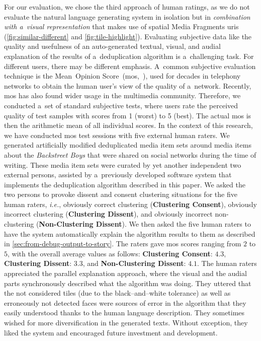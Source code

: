 \documentclass{article}
\begin{document}
For our evaluation, we chose the third approach of human ratings, as we do not evaluate the natural language generating system in isolation but in \emph{combination with a~visual representation} that makes use of spatial Media Fragments {\sc uri}s (\autoref{fig:similar-different} and \autoref{fig:tile-highlight}). Evaluating subjective data like the quality and usefulness of an auto-generated textual, visual, and audial explanation of the results of a~deduplication algorithm is a~challenging task. For different users, there may be different emphasis. A~common subjective evaluation technique
is the Mean~Opinion Score~({\sc mos},~\cite{itu1998mos}), used for decades in telephony networks to obtain the human user's view of the quality of a~network.
Recently, {\sc mos} has also found wider usage in the multimedia community. Therefore, we conducted a~set of standard subjective tests, where users rate the perceived quality of test samples with scores from 1 (worst) to 5 (best). The actual {\sc mos} is then the arithmetic mean of all individual scores. In the context of this research, we have conducted {\sc mos} test sessions with five external human raters. We generated artificially modified deduplicated media item sets around media items about the \emph{Backstreet Boys} that were shared on social networks during the time of writing. These media item sets were curated by yet another independent two external persons, assisted by a~previously developed software system that implements the deduplication algorithm described in this paper. We asked the two persons to provoke dissent and consent clustering situations for the five human raters, \emph{i.e.}, obviously correct clustering (\textbf{Clustering Consent}), obviously incorrect clustering (\textbf{Clustering Dissent}), and obviously incorrect non-clustering (\textbf{Non-Clustering Dissent}). We then asked the five human raters to have the system automatically explain the algorithm results to them as described in \autoref{sec:from-debug-output-to-story}. The raters gave {\sc mos} scores ranging from $2$ to $5$, with the overall average values as follows: \textbf{Clustering Consent}: $4.3$, \textbf{Clustering Dissent}: $3.3$, and \textbf{Non-Clustering Dissent}: $4.1$. The human raters appreciated the parallel explanation approach, where the visual and the audial parts synchronously described what the algorithm was doing. They uttered that the not considered tiles (due to the black--and--white tolerance) as well as erroneously not detected faces were sources of error in the algorithm that they easily understood thanks to the human language description. They sometimes wished for more diversification in the generated texts. Without exception, they liked the system and encouraged future investment and development.
\end{document}
